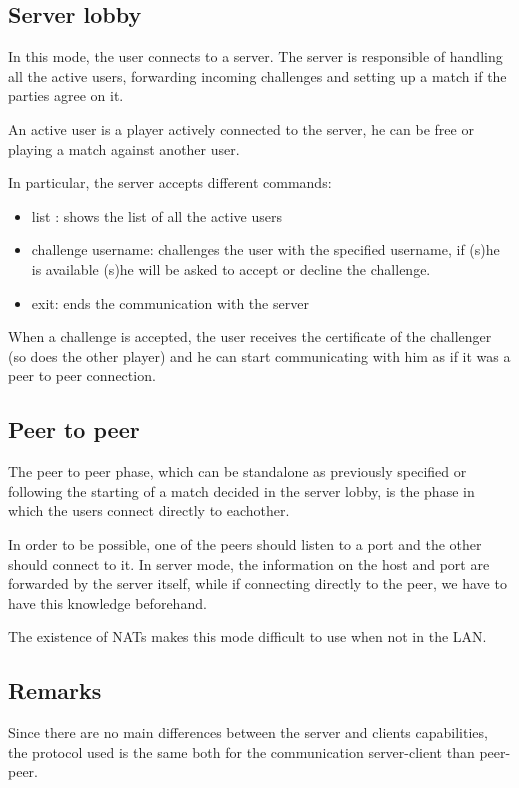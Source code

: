 \subsection{Server lobby}
In this mode, the user connects to a server. The server is responsible of handling all the active users, forwarding incoming challenges and setting up a match if the parties agree on it.

An active user is a player actively connected to the server, he can be free or playing a match against another user.

In particular, the server accepts different commands:
\begin{itemize}
	\item list : shows the list of all the active users
	\item challenge username:  challenges the user with the specified username, if (s)he is available (s)he will be asked to accept or decline the challenge.
	\item exit: ends the communication with the server
\end{itemize}

When a challenge is accepted, the user receives the certificate of the challenger (so does the other player) and he can start communicating with him as if it was a peer to peer connection.

\subsection{Peer to peer}
The peer to peer phase, which can be standalone as previously specified or following the starting of a match decided in the server lobby, is the phase in which the users connect directly to eachother.

In order to be possible, one of the peers should listen to a port and the other should connect to it. In server mode, the information on the host and port are forwarded by the server itself, while if connecting directly to the peer, we have to have this knowledge beforehand.

The existence of NATs makes this mode difficult to use when not in the LAN.

\subsection{Remarks}
Since there are no main differences between the server and clients capabilities, the protocol used is the same both for the communication server-client than peer-peer.




